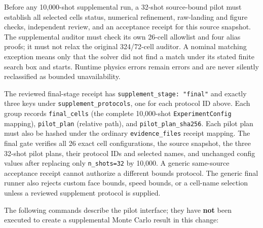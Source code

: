 \documentclass[
]{article}
\begin{document}
Before any 10,000-shot supplemental run, a 32-shot source-bound pilot
must establish all selected cells\textquotesingle{} status, numerical
refinement, raw-landing and figure checks, independent review, and an
acceptance receipt for this source snapshot. The supplemental auditor
must check its own 26-cell allowlist and four alias proofs; it must not
relax the original 324/72-cell auditor. A nominal matching exception
means only that the solver did not find a match under its stated finite
search box and starts. Runtime physics errors remain errors and are
never silently reclassified as bounded unavailability.

The reviewed final-stage receipt has
\texttt{supplement\_stage:\ "final"} and exactly three keys under
\texttt{supplement\_protocols}, one for each protocol ID above. Each
group records \texttt{final\_cells} (the complete 10,000-shot
\texttt{ExperimentConfig} mapping), \texttt{pilot\_plan} (relative
path), and \texttt{pilot\_plan\_sha256}. Each pilot plan must also be
hashed under the ordinary \texttt{evidence\_files} receipt mapping. The
final gate verifies all 26 exact cell configurations, the source
snapshot, the three 32-shot pilot plans, their protocol IDs and selected
names, and unchanged config values after replacing only
\texttt{n\_shots=32} by 10,000. A generic same-source acceptance receipt
cannot authorize a different bounds protocol. The generic final runner
also rejects custom face bounds, speed bounds, or a cell-name selection
unless a reviewed supplement protocol is supplied.

The following commands describe the pilot interface; they have
\textbf{not} been executed to create a supplemental Monte Carlo result
in this change:
\end{document}
